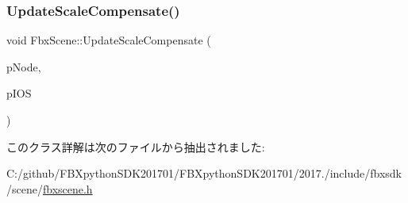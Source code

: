\subsubsection{\texorpdfstring{Update\+Scale\+Compensate()}{UpdateScaleCompensate()}}
{\footnotesize\ttfamily void Fbx\+Scene\+::\+Update\+Scale\+Compensate (\begin{DoxyParamCaption}\item[{\hyperlink{class_fbx_node}{Fbx\+Node} $\ast$}]{p\+Node,  }\item[{\hyperlink{class_fbx_i_o_settings}{Fbx\+I\+O\+Settings} \&}]{p\+I\+OS }\end{DoxyParamCaption})}



このクラス詳解は次のファイルから抽出されました\+:\begin{DoxyCompactItemize}
\item 
C\+:/github/\+F\+B\+Xpython\+S\+D\+K201701/\+F\+B\+Xpython\+S\+D\+K201701/2017./include/fbxsdk/scene/\hyperlink{fbxscene_8h}{fbxscene.\+h}\end{DoxyCompactItemize}
